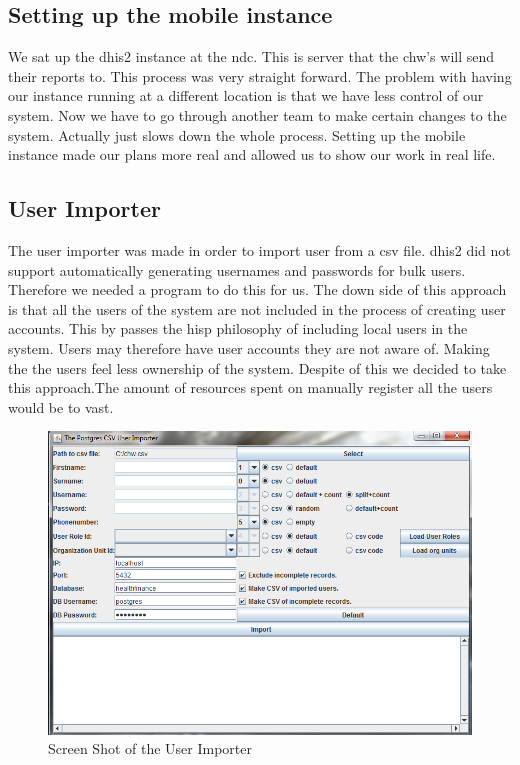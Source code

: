 \subsection{Setting up the mobile instance}
We sat up the \gls{dhis2} instance at the \gls{ndc}. This is server that the \gls{chw}'s will send their reports to. This process was very straight forward. The problem with having our instance running at a different location is that we have less control of our system. Now we have to go through another team to make certain changes to the system. Actually just slows down the whole process. Setting up the mobile instance made our plans more real and allowed us to show our work in real life. 


\subsection{User Importer}
The user importer was made in order to import user from a csv file. \gls{dhis2} did not support automatically generating usernames and passwords for bulk users. Therefore we needed a program to do this for us. The down side of this approach is that all the users of the system are not included in the process of creating user accounts. This by passes the \gls{hisp} philosophy of including local users in the system. Users may therefore have user accounts they are not aware of. Making the the users feel less ownership of the system. Despite of this we decided to take this approach.The amount of resources spent on manually register all the users would be to vast. 	

\begin{figure}
\centering
\includegraphics[width=\textwidth]{case/img/userImporterScreenShot}
\caption{Screen Shot of the User Importer}
\label{fig:screenUser}
\end{figure}

